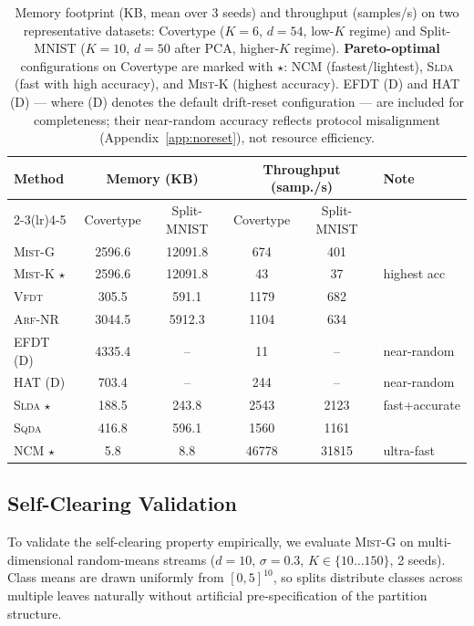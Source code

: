 \documentclass{article}
\newcommand{\mist}{\textsc{Mist}}
\newcommand{\vfdt}{\textsc{Vfdt}}
\newcommand{\slda}{\textsc{Slda}}
\newcommand{\sqda}{\textsc{Sqda}}
\newcommand{\arf}{\textsc{Arf}}
\begin{document}
\begin{table}[t]
\caption{Memory footprint (KB, mean over 3 seeds) and throughput (samples/s)
on two representative datasets: Covertype ($K=6$, $d=54$, low-$K$ regime)
and Split-MNIST ($K=10$, $d=50$ after PCA, higher-$K$ regime).
\textbf{Pareto-optimal} configurations on Covertype are marked with $\star$:
NCM (fastest/lightest), \slda{} (fast with high accuracy), and \mist{}-K
(highest accuracy). EFDT (D) and HAT (D) --- where (D) denotes the default
drift-reset configuration --- are included for completeness;
their near-random accuracy reflects protocol misalignment
(Appendix~\ref{app:noreset}), not resource efficiency.}
\label{tab:memory}
\centering
\small
\setlength{\tabcolsep}{3pt}
\begin{tabular}{lccccl}
\toprule
Method
  & \multicolumn{2}{c}{Memory (KB)}
  & \multicolumn{2}{c}{Throughput (samp./s)}
  & Note \\
\cmidrule(lr){2-3}\cmidrule(lr){4-5}
  & Covertype & Split-MNIST & Covertype & Split-MNIST & \\
\midrule
\mist{}-G         &  2596.6 & 12091.8 &    674 &    401 & \\
\mist{}-K $\star$ &  2596.6 & 12091.8 &     43 &     37 & highest acc \\
\vfdt{}           &   305.5 &   591.1 &   1179 &    682 & \\
\arf{}-NR         &  3044.5 &  5912.3 &   1104 &    634 & \\
EFDT (D)          &  4335.4 &      -- &     11 &     -- & near-random \\
HAT (D)           &   703.4 &      -- &    244 &     -- & near-random \\
\slda{} $\star$   &   188.5 &   243.8 &   2543 &   2123 & fast+accurate \\
\sqda{}           &   416.8 &   596.1 &   1560 &   1161 & \\
NCM $\star$       &     5.8 &     8.8 & 46778  & 31815  & ultra-fast \\
\bottomrule
\end{tabular}
\end{table}

\subsection{Self-Clearing Validation}
\label{app:memory-scaling}

To validate the self-clearing property empirically, we evaluate \mist{}-G
on multi-dimensional random-means streams ($d{=}10$, $\sigma{=}0.3$,
$K \in \{10\ldots150\}$, 2 seeds). Class means are drawn uniformly from
$[0,5]^{10}$, so splits distribute classes across multiple leaves
naturally without artificial pre-specification of the partition structure.
\end{document}
